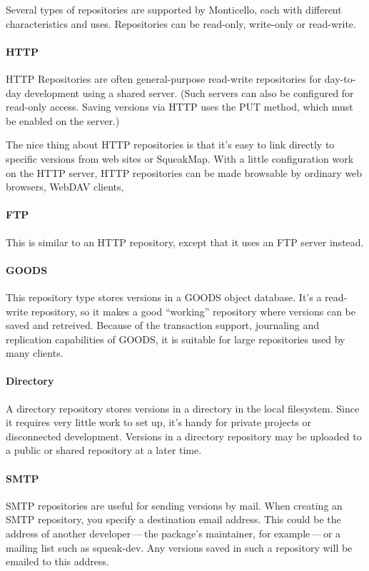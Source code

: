 \documentclass[a4paper,10pt,twoside]{book}
\begin{document}
Several types of repositories are supported by Monticello, each with different characteristics and uses. Repositories can be read-only, write-only or read-write.

\paragraph{HTTP} HTTP Repositories are often general-purpose read-write repositories for day-to-day  development using a shared server. (Such servers can also be configured for read-only access. Saving versions via HTTP uses the PUT method, which must be enabled on the server.)

The nice thing about HTTP repositories is that it's easy to link directly to specific versions from web sites or SqueakMap. With a little configuration work on the HTTP server, HTTP repositories can be made browsable by ordinary web browsers, WebDAV clients, \etc

\paragraph{FTP} This is similar to an HTTP repository, except that it uses an FTP server instead.

\paragraph{GOODS} This repository type stores versions in a GOODS object database. It's a read-write repository, so it makes a good ``working'' repository where versions can be saved and retreived. Because of the transaction support, journaling and replication capabilities of GOODS, it is suitable for large repositories used by many clients.

\paragraph{Directory} A directory repository stores versions in a directory in the local filesystem. Since it requires very little work to set up, it's handy for private projects or disconnected development. Versions in a directory repository may be uploaded to a public or shared repository at a later time.

\paragraph{SMTP} SMTP repositories are useful for sending versions by mail. When creating an SMTP repository, you specify a destination email address. This could be the address of another developer\,---\,the package's maintainer, for example\,---\,or a mailing list such as squeak-dev. Any versions saved in such a repository will be emailed to this address.
\end{document}
